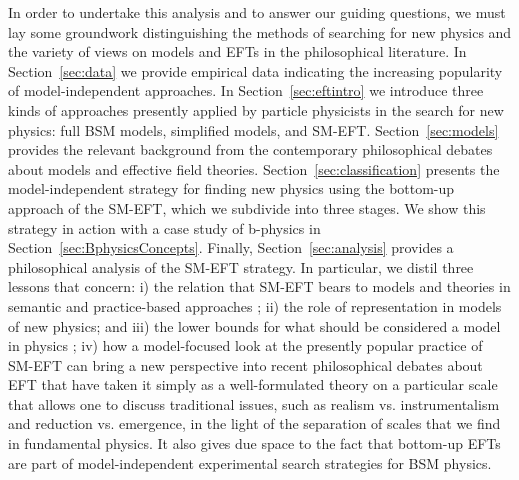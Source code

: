In order to undertake this analysis and to answer our guiding questions, we must lay some groundwork distinguishing the methods of searching for new physics and the variety of views on models and EFTs in the philosophical literature. 
In Section~\ref{sec:data} we provide empirical data indicating the increasing popularity of model-independent approaches. 
In Section~\ref{sec:eftintro} we introduce three kinds of approaches presently applied by particle physicists in the search for new physics: full BSM models, simplified models, and SM-EFT. 
Section~\ref{sec:models} provides the relevant background from the contemporary philosophical debates about models and effective field theories. 
Section~\ref{sec:classification} presents the model-independent strategy for finding new physics using the bottom-up approach of the SM-EFT, which we subdivide into three stages.
We show this strategy in action with a case study of b-physics in Section~\ref{sec:BphysicsConcepts}. 
Finally, Section~\ref{sec:analysis} provides a philosophical analysis of the SM-EFT strategy.  
In particular, we distil three lessons that concern: i) the relation that SM-EFT bears to models and theories in semantic \citep{hartmann1998} and practice-based approaches \citep{morganmorrison}; ii) the role of representation in models of new physics; and iii) the lower bounds for what should be considered a model in physics {\MSnote ; iv) how a model-focused look at the presently popular practice of SM-EFT can bring a new perspective into recent philosophical debates about EFT that have taken it simply as a well-formulated theory on a particular scale that allows one to discuss traditional issues, such as realism vs. instrumentalism and reduction vs. emergence, in the light of the separation of scales that we find in fundamental physics. It also gives due space to the fact that bottom-up EFTs are part of model-independent experimental search strategies for BSM physics.}
